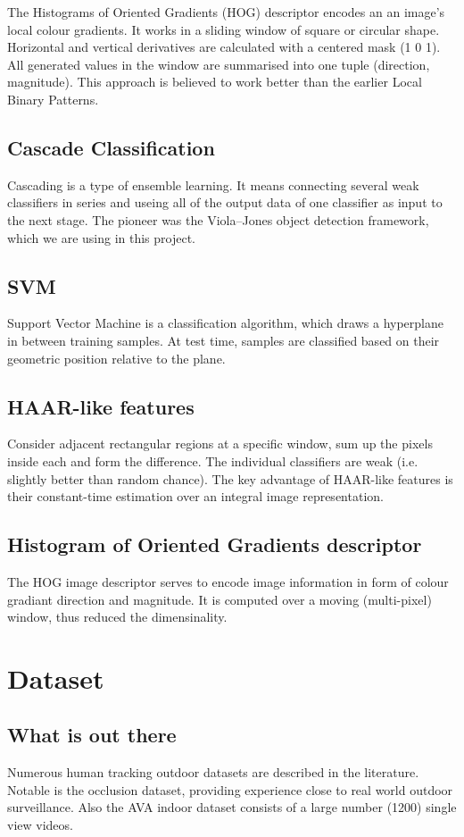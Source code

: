 \documentclass{article}
\begin{document}
The Histograms of Oriented Gradients (HOG)\cite{hog} descriptor encodes an an image's local colour gradients.
It works in a sliding window of square or circular shape.
Horizontal and vertical derivatives are calculated with a centered mask (1 0 1).
All generated values in the window are summarised into one tuple (direction, magnitude).
This approach is believed to work better than the earlier Local Binary Patterns.

\subsection{Cascade Classification}
Cascading is a type of ensemble learning.
It means connecting several weak classifiers in series and useing all of the output data of one classifier as input to the next stage.
The pioneer was the Viola–Jones object detection framework, which we are using in this project.


\subsection{SVM}
Support Vector Machine is a classification algorithm, which draws a hyperplane in between training samples.
At test time, samples are classified based on their geometric position relative to the plane.


\subsection{HAAR-like features}
Consider adjacent rectangular regions at a specific window, sum up the pixels inside each and form the difference.
The individual classifiers are weak (i.e. slightly better than random chance).
The key advantage of HAAR-like features is their constant-time estimation over an integral image representation.


\subsection{Histogram of Oriented Gradients descriptor}
The HOG image descriptor serves to encode image information in form of colour gradiant direction and magnitude.
It is computed over a moving (multi-pixel) window, thus reduced the dimensinality.


\section{Dataset}
\subsection{What is out there}
Numerous human tracking outdoor datasets are described in the literature\cite{datasets0}\cite{datasets1}.
Notable is the occlusion dataset\cite{datasets2}, providing experience close to real world outdoor surveillance.
Also the AVA indoor dataset\cite{ava} consists of a large number (1200) single view videos.
\end{document}
